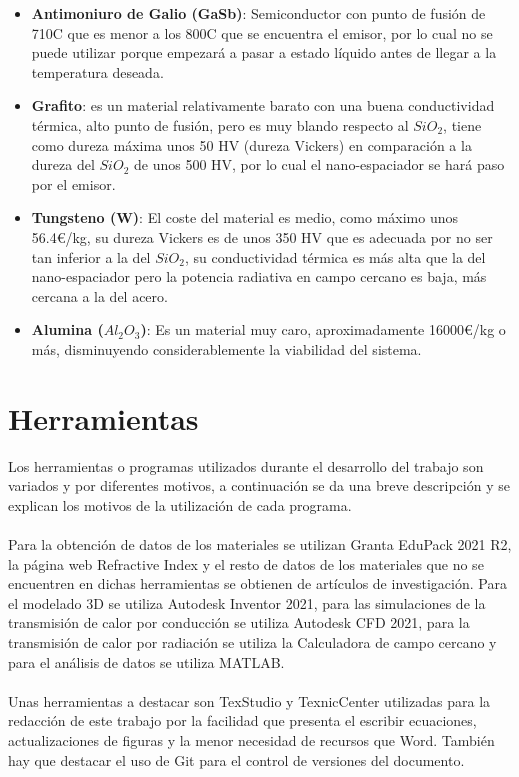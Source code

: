 \begin{itemize}
	\item \textbf{Antimoniuro de Galio (GaSb)}: Semiconductor con punto de fusión de 710\textdegree C que es menor a los 800\textdegree C que se encuentra el emisor, por lo cual no se puede utilizar porque empezará a pasar a estado líquido antes de llegar a la temperatura deseada.
	\item \textbf{Grafito}: es un material relativamente barato con una buena conductividad térmica, alto punto de fusión, pero es muy blando respecto al $SiO_2$, tiene como dureza máxima unos 50 HV (dureza Vickers) en comparación a la dureza del $SiO_2$ de unos 500 HV, por lo cual el nano-espaciador se hará paso por el emisor.
	\item \textbf{Tungsteno (W)}: El coste del material es medio, como máximo unos 56.4€/kg, su dureza Vickers es de unos 350 HV que es adecuada por no ser tan inferior a la del $SiO_2$, su conductividad térmica es más alta que la del nano-espaciador pero la potencia radiativa en campo cercano es baja, más cercana a la del acero.
	\item \textbf{Alumina ($Al_2O_3$)}: Es un material muy caro, aproximadamente 16000€/kg o más, disminuyendo considerablemente la viabilidad del sistema.
\end{itemize}

\section{Herramientas}

Los herramientas o programas utilizados durante el desarrollo del trabajo son variados y por diferentes motivos, a continuación se da una breve descripción y se explican los motivos de la utilización de cada programa.\\\\
Para la obtención de datos de los materiales se utilizan Granta EduPack 2021 R2, la página web Refractive Index y el resto de datos de los materiales que no se encuentren en dichas herramientas se obtienen de artículos de investigación. Para el modelado 3D se utiliza Autodesk Inventor 2021, para las simulaciones de la transmisión de calor por conducción se utiliza Autodesk CFD 2021, para la transmisión de calor por radiación se utiliza la Calculadora de campo cercano y para el análisis de datos se utiliza MATLAB.\\\\
Unas herramientas a destacar son TexStudio y TexnicCenter utilizadas para la redacción de este trabajo por la facilidad que presenta el escribir ecuaciones, actualizaciones de figuras y la menor necesidad de recursos que Word. También hay que destacar el uso de Git para el control de versiones del documento.\\
